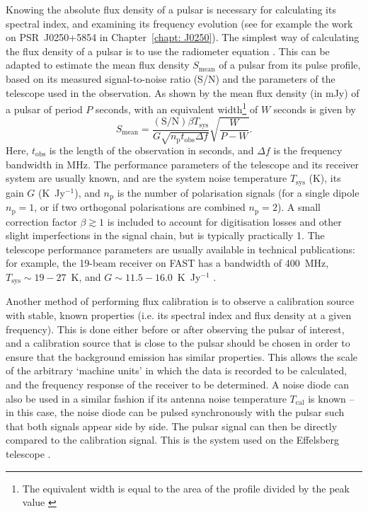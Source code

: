 Knowing the absolute flux density of a pulsar is necessary for calculating its spectral index, and examining its frequency evolution (see for example the work on PSR~J0250+5854 in Chapter~\ref{chapt: J0250}).
The simplest way of calculating the flux density of a pulsar is to use the radiometer equation \citep{Dxxx1946}. This can be adapted to estimate the mean flux density $S_\mathrm{mean}$ of a pulsar from its pulse profile, based on its measured signal-to-noise ratio (S/N) and the parameters of the telescope used in the observation. As shown by \citet{Handbook} the mean flux density (in mJy) of a pulsar of period $P$ seconds, with an equivalent width\footnote{The equivalent width is equal to the area of the profile divided by the peak value \citep[e.g.][]{TMxx1975}} of $W$ seconds is given by
\begin{equation}
    \label{eq: intro - pulsar radiometer equation}
    S_\mathrm{mean} = \frac{(\mathrm{S/N}) \beta T_\mathrm{sys}}{G\sqrt{n_\mathrm{p}t_\mathrm{obs}\Delta f}}\sqrt{\frac{W}{P-W}}.
\end{equation}
Here, $t_\mathrm{obs}$ is the length of the observation in seconds, and $\Delta f$ is the frequency bandwidth in MHz. The performance parameters of the telescope and its receiver system are usually known, and are the system noise temperature $T_\mathrm{sys}$ (K), its gain $G$ (K~Jy$^{-1}$), and $n_\mathrm{p}$ is the number of polarisation signals (for a single dipole $n_\mathrm{p} = 1$, or if two orthogonal polarisations are combined $n_\mathrm{p} = 2$). A small correction factor $\beta \gtrsim 1$ is included to account for digitisation losses and other slight imperfections in the signal chain, but is typically practically 1. The telescope performance parameters are usually available in technical publications: for example, the 19-beam receiver on FAST has a bandwidth of 400~MHz, $T_\mathrm{sys} \sim 19 - 27$~K, and $G\sim 11.5 - 16.0$~K~Jy$^{-1}$ \citep{JTH+2020}.

Another method of performing flux calibration is to observe a calibration source with stable, known properties (i.e. its spectral index and flux density at a given frequency). This is done either before or after observing the pulsar of interest, and a calibration source that is close to the pulsar should be chosen in order to ensure that the background emission has similar properties. This allows the scale of the arbitrary `machine units' in which the data is recorded to be calculated, and the frequency response of the receiver to be determined. A noise diode can also be used in a similar fashion if its antenna noise temperature $T_\mathrm{cal}$ is known -- in this case, the noise diode can be pulsed synchronously with the pulsar such that both signals appear side by side. The pulsar signal can then be directly compared to the calibration signal. This is the system used on the Effelsberg telescope \citep{SGG+1995}.







